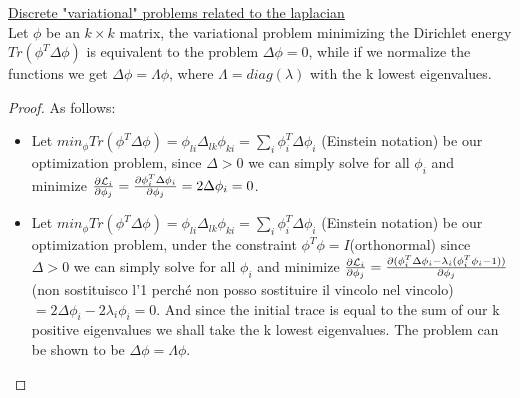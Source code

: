 \documentclass[../main.tex]{subfiles}
\begin{document}
\begin{prop}
    \underline{Discrete "variational" problems related to the laplacian}\\
    Let $\phi$ be an $k \times k$ matrix, the variational problem minimizing the Dirichlet energy $Tr(\phi^T \Delta \phi)$ is equivalent to
    the problem $\Delta \phi = 0$, while if we normalize the functions we get $\Delta \phi = \Lambda \phi$, where $\Lambda = diag(\lambda)$ with 
    the k lowest eigenvalues.
\end{prop}
\begin{proof} As follows:\\
    \begin{itemize}
        \item
	Let $min_{\phi}Tr(\phi^T \Delta \phi) = \phi_{li}\Delta_{lk}\phi_{ki} = \sum_i \phi_i^T \Delta \phi_i $ (Einstein notation) be our optimization problem,
	since $\Delta > 0$ we can simply solve for all $\phi_i$ and minimize $\frac{\partial \mathcal{L}_i}{\partial \phi_j} = \frac{\partial \phi_i^T \Delta \phi_i}{\partial \phi_j}
	 = 2\Delta\phi_i=0$.
	 \item
	Let $min_{\phi}Tr(\phi^T \Delta \phi) = \phi_{li}\Delta_{lk}\phi_{ki} = \sum_i \phi_i^T \Delta \phi_i $ (Einstein notation) be our optimization problem,
        under the constraint $\phi^T \phi = I$(orthonormal) since $\Delta > 0$ we can simply solve for all $\phi_i$ and minimize 
	$\frac{\partial \mathcal{L}_i}{\partial \phi_j} = \frac{\partial (\phi_i^T \Delta \phi_i -\lambda_i(\phi_i^T\phi_i -1))}{\partial \phi_j}$(non sostituisco l'1 perché non posso sostituire il vincolo 
	nel vincolo)$ = 2\Delta\phi_i-2\lambda_i\phi_i=0$. And since the initial trace is equal to the sum of our k positive eigenvalues we shall take the
	k lowest eigenvalues. The problem can be shown to be $\Delta \phi = \Lambda \phi$.
   \end{itemize}
\end{proof}

\end{document}
